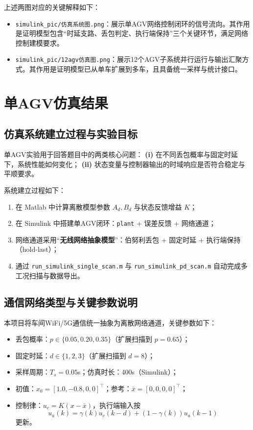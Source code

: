 \documentclass[12pt,a4paper]{article}
\begin{document}
上述两图对应的关键解释如下：
\begin{itemize}
    \item \texttt{simulink\_pic/仿真系统图.png}：展示单AGV网络控制闭环的信号流向。其作用是证明模型包含“时延支路、丢包判定、执行端保持”三个关键环节，满足网络控制建模要求。
    \item \texttt{simulink\_pic/12agv仿真图.png}：展示12个AGV子系统并行运行与输出汇聚方式。其作用是证明模型已从单车扩展到多车，且具备统一采样与统计接口。
\end{itemize}

\section{单AGV仿真结果}
\subsection{仿真系统建立过程与实验目标}
单AGV实验用于回答题目中的两类核心问题：  
\textbf{(i)} 在不同丢包概率与固定时延下，系统性能如何变化；  
\textbf{(ii)} 状态变量与控制器输出的时域响应是否符合稳定与平顺要求。

系统建立过程如下：
\begin{enumerate}
    \item 在 Matlab 中计算离散模型参数 $A_d,B_d$ 与状态反馈增益 $K$；
    \item 在 Simulink 中搭建单AGV闭环：\texttt{plant} + 误差反馈 + 网络通道；
    \item 网络通道采用“\textbf{无线网络抽象模型}”：伯努利丢包 + 固定时延 + 执行端保持（hold-last）；
    \item 通过 \texttt{run\_simulink\_single\_scan.m} 与 \texttt{run\_simulink\_pd\_scan.m} 自动完成多工况扫描与数据导出。
\end{enumerate}

\subsection{通信网络类型与关键参数说明}
本项目将车间WiFi/5G通信统一抽象为离散网络通道，关键参数如下：
\begin{itemize}
    \item 丢包概率：$p\in\{0.05,0.20,0.35\}$（扩展扫描到 $p=0.65$）；
    \item 固定时延：$d\in\{1,2,3\}$（扩展扫描到 $d=8$）；
    \item 采样周期：$T_s=0.05$s；仿真时长：400s（Simulink）；
    \item 初值：$x_0=[1.0,-0.8,0,0]^\top$；参考：$\bar x=[0,0,0,0]^\top$；
    \item 控制律：$u_c=K(x-\bar x)$，执行端输入按
    \[
    u_a(k)=\gamma(k)u_c(k-d)+(1-\gamma(k))u_a(k-1)
    \]
    更新。
\end{itemize}
\end{document}
